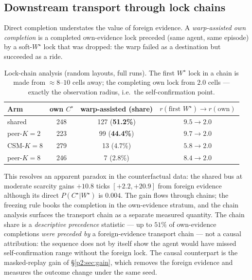 \documentclass{article}
\newcommand{\wstar}{W^{\star}}
\newcommand{\cstar}{C^{\star}}
\begin{document}
\subsection{Downstream transport through lock chains}
\label{p2:sec:taxi}

Direct completion understates the value of foreign evidence. A
\emph{warp-assisted own completion} is a completed own-evidence lock
preceded (same agent, same episode) by a soft-$\wstar$ lock that was
dropped: the warp failed as a destination but succeeded as a ride.

\begin{table}[h]
\centering
\caption{Lock-chain analysis (random layouts, full runs). The first
$\wstar$ lock in a chain is made from ${\approx}8$--$10$ cells away;
the completing own lock from $2.0$ cells --- exactly the observation
radius, i.e.\ the self-confirmation point.}
\label{p2:tab:taxi}
\small
\begin{tabular}{lccc}
\toprule
Arm & own $\cstar$ & warp-assisted (share) & $r(\text{first }\wstar) \to r(\text{own})$ \\
\midrule
shared          & 248 & 127 (\textbf{51.2\%}) & $9.5 \to 2.0$ \\
peer-$K{=}2$    & 223 & 99 (\textbf{44.4\%})  & $9.7 \to 2.0$ \\
CSM-$K{=}8$     & 279 & 13 (4.7\%)            & $5.8 \to 2.0$ \\
peer-$K{=}8$    & 246 & 7 (2.8\%)             & $8.4 \to 2.0$ \\
\bottomrule
\end{tabular}
\end{table}

This resolves an apparent paradox in the counterfactual data: the
shared bus at moderate scarcity gains $+10.8$ ticks $[+2.2,+20.9]$
from foreign evidence although its direct $P(\cstar|\wstar)$ is
$0.004$. The gain flows through chains; the freezing rule books the
completion in the own-evidence stratum, and the chain analysis
surfaces the transport chain as a separate measured quantity. The
chain share is a \emph{descriptive precedence} statistic --- up to
$51\%$ of own-evidence completions \emph{were preceded by} a
foreign-evidence transport chain --- not a causal attribution: the
sequence does not by itself show the agent would have missed
self-confirmation range without the foreign lock. The causal
counterpart is the masked-replay gain of \S\ref{p2:sec:gain}, which
removes the foreign evidence and measures the outcome change under
the same seed.
\end{document}
